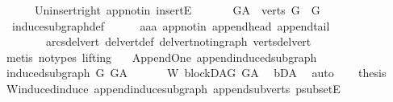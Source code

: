 \begin{isabellebody}
\ \ \ \ \ \ Un{\isacharunderscore}{\kern0pt}insert{\isacharunderscore}{\kern0pt}right\ app{\isacharunderscore}{\kern0pt}notin\ insertE{\isacharparenright}{\kern0pt}\ \ \isanewline
\ \ \isamarkupfalse%
\ \ {\isachardoublequoteopen}G{\isacharunderscore}{\kern0pt}A\ {\isasymrestriction}\ verts\ G\ {\isacharequal}{\kern0pt}\ G{\isachardoublequoteclose}\ \isanewline
\ \ \ \ \isamarkupfalse%
\ \ induce{\isacharunderscore}{\kern0pt}subgraph{\isacharunderscore}{\kern0pt}def\isanewline
\ \ \ \ \isamarkupfalse%
\ aaa\ app{\isacharunderscore}{\kern0pt}notin\ append{\isacharunderscore}{\kern0pt}head\ append{\isacharunderscore}{\kern0pt}tail\ \isanewline
\ \ \ \ \ \ \ \ arcs{\isacharunderscore}{\kern0pt}del{\isacharunderscore}{\kern0pt}vert\ del{\isacharunderscore}{\kern0pt}vert{\isacharunderscore}{\kern0pt}def\ del{\isacharunderscore}{\kern0pt}vert{\isacharunderscore}{\kern0pt}not{\isacharunderscore}{\kern0pt}in{\isacharunderscore}{\kern0pt}graph\ verts{\isacharunderscore}{\kern0pt}del{\isacharunderscore}{\kern0pt}vert\isanewline
\ \ \ \ \isamarkupfalse%
\ {\isacharparenleft}{\kern0pt}metis\ {\isacharparenleft}{\kern0pt}no{\isacharunderscore}{\kern0pt}types{\isacharcomma}{\kern0pt}\ lifting{\isacharparenright}{\kern0pt}{\isacharparenright}{\kern0pt}\ \isanewline
{}\isamarkupfalse%
%
\endisatagproof
{\isafoldproof}%
%
\isadelimproof
\isanewline
%
\endisadelimproof
\isanewline
{}\isamarkupfalse%
\ {\isacharparenleft}{\kern0pt}\ Append{\isacharunderscore}{\kern0pt}One{\isacharparenright}{\kern0pt}\ append{\isacharunderscore}{\kern0pt}induced{\isacharunderscore}{\kern0pt}subgraph{\isacharcolon}{\kern0pt}\ \isanewline
\ {\isachardoublequoteopen}induced{\isacharunderscore}{\kern0pt}subgraph\ G\ G{\isacharunderscore}{\kern0pt}A\ {\isachardoublequoteclose}\isanewline
%
\isadelimproof
%
\endisadelimproof
%
\isatagproof
{}\isamarkupfalse%
\ {\isacharminus}{\kern0pt}\isanewline
\ \ \isamarkupfalse%
\ W{\isacharcolon}{\kern0pt}\ blockDAG\ {\isachardoublequoteopen}G{\isacharunderscore}{\kern0pt}A{\isachardoublequoteclose}\ \isamarkupfalse%
\ bD{\isacharunderscore}{\kern0pt}A\ \isamarkupfalse%
\ auto\isanewline
\ \ \isamarkupfalse%
\ {\isacharquery}{\kern0pt}thesis\isanewline
\ \ \isamarkupfalse%
\ W{\isachardot}{\kern0pt}induced{\isacharunderscore}{\kern0pt}induce\ append{\isacharunderscore}{\kern0pt}induce{\isacharunderscore}{\kern0pt}subgraph\ append{\isacharunderscore}{\kern0pt}subverts\ psubsetE\isanewline

\end{isabellebody}
